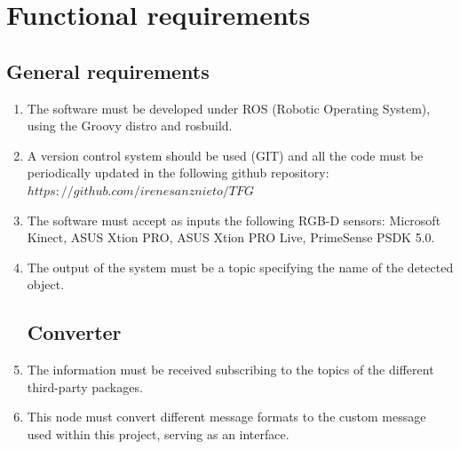 \documentclass{article}
\makeatletter
\def\threedigits#1{\expandafter\@threedigits\csname c@#1\endcsname}
\def\@threedigits#1{%
  \ifnum#1<100 0\fi
  \ifnum#1<10 0\fi
  \number#1}
\makeatother
\begin{document}
\section{Functional requirements}

\subsection{General requirements}

\begin{enumerate}[label=\textbf{FR\threedigits*}, leftmargin=2cm]

	\item The software must be developed under ROS (Robotic Operating System), using the Groovy distro and rosbuild.
	\item A version control system should be used (GIT) and all the code must be periodically updated in the following github repository:  $https://github.com/irenesanznieto/TFG$
	\item The software must accept as inputs the following RGB-D sensors: Microsoft Kinect, ASUS Xtion PRO, ASUS Xtion PRO Live, PrimeSense PSDK 5.0.
	\item The output of the system must be a topic specifying the name of the detected object. 
 
 
\subsection{Converter}

\item The information must be received subscribing to the topics of the different third-party packages. 
\item This node must convert different message formats to the custom message used within this project, serving as an interface. 



\end{enumerate}
\end{document}
